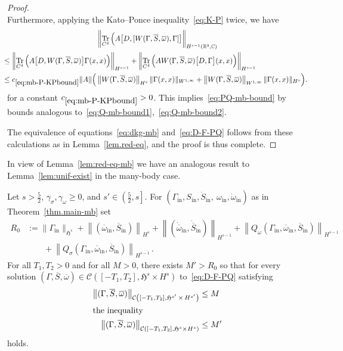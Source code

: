 \documentclass[AHL,Unicode,longabstracts,published]{cedram}
\DeclareMathOperator{\tr}{Tr}
\newcommand{\rmin}{\mathrm{in}}
\newcommand{\cC}{\mathcal{C}}
\newcommand\R{\mathbb{R}}
\newcommand\C{\mathbb{C}}
\newcommand{\gH}{\mathfrak{H}}
\begin{document}
\begin{proof}
\begin{equation}
\end{equation}
Furthermore, applying the Kato--Ponce inequality~\eqref{eq:K-P} twice, we have
\begin{multline}\label{eq:mb-P-KPbound}
\left\|\tr_{C^4}\Big(A\big[D,[W(\Gamma, \overline{S}, \overline{\omega}), \Gamma]\big]\right\|_{H^{s-1}(\R^3,\C)}\\
\mkern-14mu{\begin{aligned}
&\leq \left\|\tr_{C^4}\Big(A\big[D,W(\Gamma, \overline{S}, \overline{\omega})\big] \Gamma(x,x)\Big)\right\|_{H^{s-1}} + \left\|\tr_{C^4}\Big(A W(\Gamma, \overline{S}, \overline{\omega})\big[D,\Gamma\big] (x,x)\Big)\right\|_{H^{s-1}}\\
&\leq c_{\eqref{eq:mb-P-KPbound}} \|A\|\Big(\left\|W(\Gamma, \overline{S}, \overline{\omega})\right\|_{H^{s}} \|\Gamma(x,x)\|_{W^{1,\infty}} + \left\|W(\Gamma, \overline{S}, \overline{\omega})\right\|_{W^{1, \infty}} \|\Gamma(x,x)\|_{H^{s}} \Big).
\end{aligned}}
\end{multline}
for a constant $c_{\eqref{eq:mb-P-KPbound}}>0$. This implies~\eqref{eq:PQ-mb-bound} by bounds analogous to~\eqref{eq:Q-mb-bound1},~\eqref{eq:Q-mb-bound2}.

The equivalence of equations~\eqref{eq:dkg-mb} and~\eqref{eq:D-F-PQ} follows from these calculations as in Lemma~\ref{lem.red-eq}, and the proof is thus complete.
\end{proof}

In view of Lemma~\ref{lem:red-eq-mb} we have an analogous result to Lemma~\ref{lem:unif-exist} in the many-body case.

\begin{lemm}\label{lem:unif-exist-mb}
Let $s>\tfrac52$, $\gamma_\sigma, \gamma_\omega\geq 0$, and $s'\in\left(\tfrac52,s\right]$. For $(\Gamma_\rmin, S_\rmin, \dot S_\rmin, \ \omega_\rmin, \dot \omega_\rmin)$ as in Theorem~\ref{thm.main-mb} set
\begin{align*}
R_0&:= \|\Gamma_\rmin\|_{\gH^s} +\left\|(\overline{\omega}_\rmin, \overline{S}_\rmin)\right\|_{H^s} + \left\|(\dot{\overline{\omega}}_\rmin, \dot{\overline{S}}_\rmin)\right\|_{H^{s-1}} +\left\|Q_\omega(\Gamma_\rmin, \overline{\omega}_\rmin, \overline{S}_\rmin)\right\|_{H^{s-1}}\\
&\qquad+ \left\|Q_\sigma(\Gamma_\rmin, \overline{\omega}_\rmin, \overline{S}_\rmin)\right\|_{H^{s-1}}\,.
\end{align*}
For all $T_1,T_2>0$ and for all $M>0$, there exists $M'>R_0$ so that for every solution $(\Gamma, \overline{S},\overline{\omega})\in \cC([-T_1, T_2],\gH^s \times H^s)$ to~\eqref{eq:D-F-PQ} satisfying
\begin{align}
\left\| (\Gamma, \overline{S}, \overline{\omega}) \right\|_{\cC\left([-T_1, T_2],\gH^{s'}\,\times\, H^{s'}\right)} &\leq M
\nonumber\\
\intertext{the inequality}
\left\|(\Gamma, \overline{S}, \overline{\omega})\right\|_{\cC\left([-T_1, T_2],\gH^s\times H^s\right)} &\leq M'\label{pt2-unif-mb}
\end{align}
holds.
\end{lemm}
\end{document}
